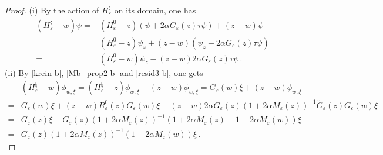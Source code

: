 \documentclass[a4paper,11pt,reqno]{amsart}
\theoremstyle{definition}
\numberwithin{equation}{section}
\newcommand{\ve}{\varepsilon}
\newcommand{\bosfer}{{\natural}}
\begin{document}
\begin{proof} (i) By the action  of $H^\bosfer_\ve$ on its domain, one has
\begin{align*}
(H^\bosfer_\ve -w ) \psi =& (H^{0}_\ve - z) (\psi+2\alpha G_{\ve}(z)\tau\psi)
 + (z-w) \psi\\
 =& (H^{0}_\ve -z) \psi_{z}
 + (z-w) (\psi_{z}-2\alpha G_{\ve}(z)\tau\psi)\\
 =&(H^{0}_{\ve} -w)\psi_{z}-(z-w) 2\alpha G_{\ve}(z)\tau\psi\,.
\end{align*}
(ii) By \eqref{krein-b}, \eqref{Mb_prop2-b} and \eqref{resid3-b}, one gets
\begin{align*}
&(H^\bosfer_\ve - w)\phi_{w,\xi}=(H^\bosfer_\ve - z)\phi_{w,\xi}+(z-w)\phi_{w,\xi}
=G_{\ve}(w)\xi+(z-w)\phi_{w,\xi}\\
=&G_{\ve}(w)\xi+(z-w)R^{0}_{\ve}(z)G_{\ve}(w)\xi - (z-w)2\alpha G_{\ve}(z)(1  +2\alpha M_{\ve}(z))^{-1} \breve G_{\ve}(z)G_{\ve}(w)\xi\\
=&G_{\ve}(z)\xi-  G_{\ve}(z)(1  +2\alpha M_{\ve}(z))^{-1} (1+2\alpha M_{\ve}(z)-1-2\alpha M_{\ve}(w))\xi\\
=&G_\ve (z) \left( 1  + 2\alpha M_{\ve}(z)\right)^{-1} \left( 1  +2\alpha M_{\ve}(w)\right) \xi\,.
\end{align*}
\end{proof}
\end{document}
